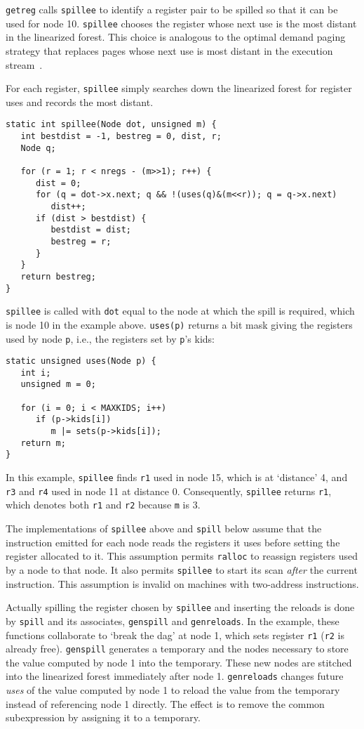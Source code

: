 \verb|getreg| calls \verb|spillee| to identify a register pair
to be spilled so that it can be used for node 10.
\verb|spillee| chooses the register whose next use
is the most distant in the linearized forest.
This choice is analogous to the optimal demand paging strategy that
replaces pages whose next use is most distant
in the execution stream~\cite{freiburghouse}.

For each register,
\verb|spillee| simply searches down the linearized forest
for register uses and records the most distant.
\begin{verbatim}
static int spillee(Node dot, unsigned m) {
   int bestdist = -1, bestreg = 0, dist, r;
   Node q;

   for (r = 1; r < nregs - (m>>1); r++) {
      dist = 0;
      for (q = dot->x.next; q && !(uses(q)&(m<<r)); q = q->x.next)
         dist++;
      if (dist > bestdist) {
         bestdist = dist;
         bestreg = r;
      }
   }
   return bestreg;
}
\end{verbatim}
\verb|spillee| is called with \verb|dot| equal to the node at which
the spill is required, which is node 10 in the example above.
\verb|uses(p)| returns a bit mask giving the registers used by node \verb|p|,
i.e., the registers set by \verb|p|'s kids:
\begin{verbatim}
static unsigned uses(Node p) {
   int i;
   unsigned m = 0;

   for (i = 0; i < MAXKIDS; i++)
      if (p->kids[i])
         m |= sets(p->kids[i]);
   return m;
}
\end{verbatim}

In this example, \verb|spillee| finds \verb|r1| used
in node 15, which is at `distance' 4, and
\verb|r3| and \verb|r4| used in node 11 at distance 0.
Consequently, \verb|spillee| returns \verb|r1|, which denotes
both \verb|r1| and \verb|r2| because \verb|m| is 3.

The implementations of \verb|spillee| above and \verb|spill| below
assume that the instruction
emitted for each node reads the registers it uses before setting
the register allocated to it. This assumption
permits \verb|ralloc| to reassign registers used by a node to that node.
It also permits \verb|spillee| to start its scan {\em after} the
current instruction.
This assumption is invalid on machines with two-address instructions.

Actually spilling the register chosen by \verb|spillee| and inserting
the reloads is done by \verb|spill| and its associates, \verb|genspill|
and \verb|genreloads|.
In the example, these functions collaborate to `break the dag'
at node 1, which sets register \verb|r1| (\verb|r2| is already free).
\verb|genspill| generates a temporary and the nodes necessary
to store the value computed by node 1 into the temporary.
These new nodes are stitched into the linearized forest immediately
after node 1. \verb|genreloads| changes future {\em uses} of the
value computed by node 1 to reload the value from
the temporary instead of referencing node 1 directly.
The effect is to remove the common subexpression
by assigning it to a temporary.

